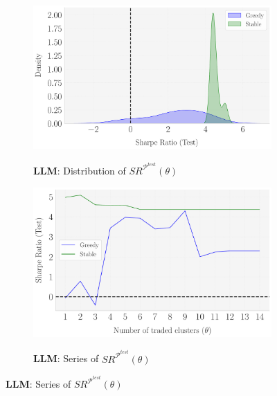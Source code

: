 \begin{figure}[H]
  \bx 
      \begin{subfigure}[b]{0.46\textwidth}
    \centering
    \caption{\textbf{LLM}: Distribution of $SR^{\mathcal P^{test}}(\theta)$} 
    \includegraphics[width=\textwidth]{fig_10c_LLAMA_Distr_theta(SR-Test).pdf}
    \label{fig:LLM_Robustness_theta_Distr}
  \end{subfigure}
  \hspace{0.05\textwidth} %
  \begin{subfigure}[b]{0.46\textwidth}
    \centering
    \caption{\textbf{LLM}: Series of $SR^{\mathcal P^{test}}(\theta)$} 
    \includegraphics[width=\textwidth]{fig_10d_LLAMA_SR-Test_vs_theta.pdf}
    \label{fig:LLM_Robustness_theta_Series}
  \end{subfigure}


\end{figure}
